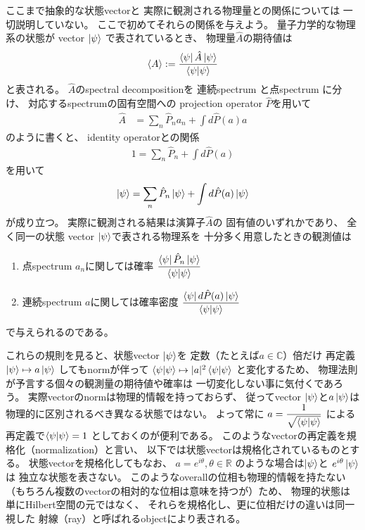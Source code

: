 ここまで抽象的な状態vectorと
実際に観測される物理量との関係については
一切説明していない。
ここで初めてそれらの関係を与えよう。
量子力学的な物理系の状態が
vector $\ket{\psi}$
で表されているとき、
物理量$\hat{A}$の期待値は
\begin{align}
    \braket{A} :=
    \dfrac{
        \bra{\psi} \hat{A} \ket{\psi}
    }{
        \braket{\psi|\psi}
    }
\end{align}
と表される。
$\hat{A}$のspectral decompositionを
連続spectrum と点spectrum に分け、
対応するspectrumの固有空間への
projection operator $\hat{P}$を用いて
\begin{align}
    \hat{A} &=
    \sum_n { \hat{P}_n a_n }
    +
    \int d \hat{P} (a) a
\end{align}
のように書くと、
identity operatorとの関係
\begin{align}
    1 =
    \sum_n \hat{P}_n
    +
    \int d \hat{P} (a)
\label{spectral decomposition of identity}
\end{align}
を用いて
\begin{align}
    \ket{\psi} =
    \sum_n \hat{P}_n \ket{\psi}
    +
    \int d \hat{P} (a) \ket{\psi}
\end{align}
が成り立つ。
実際に観測される結果は演算子$\hat{A}$の
固有値のいずれかであり、
全く同一の状態 vector $\ket{\psi}$で表される物理系を
十分多く用意したときの観測値は
\begin{enumerate}
    \item{点spectrum $a_n$に関しては確率
    $
    \dfrac{
        \bra{\psi} \hat{P}_n \ket{\psi}
    }{
     \braket{\psi|\psi}
    }
    $}
    \item{連続spectrum $a$に関しては確率密度
    $
    \dfrac{
        \bra{\psi} d \hat{P}(a) \ket{\psi}
    }{
     \braket{\psi|\psi}
    }
    $}
\end{enumerate}
で与えられるのである。

これらの規則を見ると、状態vector $\ket{\psi}$を
定数（たとえば$a \in \mathbb{C}$）倍だけ
再定義
$\ket{\psi} \mapsto a \ket{\psi}$
してもnormが伴って
$\braket{\psi|\psi} \mapsto |a|^2 \braket{\psi|\psi}$
と変化するため、
物理法則が予言する個々の観測量の期待値や確率は
一切変化しない事に気付くであろう。
実際vectorのnormは物理的情報を持っておらず、
従ってvector $\ket{\psi}$と$a \ket{\psi}$は
物理的に区別されるべき異なる状態ではない。
よって常に
$a = \dfrac{1}{\sqrt{ \braket{\psi|\psi} }}$
による再定義で$\braket{\psi|\psi} = 1$
としておくのが便利である。
このようなvectorの再定義を規格化（normalization）と言い、
以下では状態vectorは規格化されているものとする。
状態vectorを規格化してもなお、
$a=e^{i\theta}, \theta\in \mathbb{R}$
のような場合は$\ket{\psi}$と
$e^{i\theta}\ket{\psi}$は
独立な状態を表さない。
このようなoverallの位相も物理的情報を持たない
（もちろん複数のvectorの相対的な位相は意味を持つが）ため、
物理的状態は単にHilbert空間の元ではなく、
それらを規格化し、更に位相だけの違いは同一視した
射線（ray）と呼ばれるobjectにより表される。

